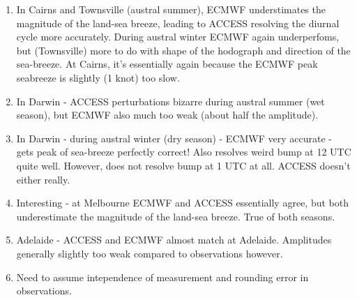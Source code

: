 \documentclass{article}
\begin{document}
\begin{enumerate}
\item
In Cairns and Townsville (austral summer), ECMWF understimates the magnitude of the land-sea breeze, leading to ACCESS resolving the diurnal cycle more accurately. During austral winter ECMWF again underperfoms, but (Townsville) more to do with shape of the hodograph and direction of the sea-breeze. At Cairns, it's essentially again because the ECMWF peak seabreeze is slightly (1 knot) too slow.   
\item
In Darwin - ACCESS perturbations bizarre during austral summer (wet season), but ECMWF also much too weak (about half the amplitude). 
\item
In Darwin - during austral winter (dry season) - ECMWF very accurate - gets peak of sea-breeze perfectly correct! Also resolves weird bump at 12 UTC quite well. However, does not resolve bump at 1 UTC at all. ACCESS doesn't either really. 
\item
Interesting - at Melbourne ECMWF and ACCESS essentially agree, but both underestimate the magnitude of the land-sea breeze. True of both seasons. 
\item
Adelaide - ACCESS and ECMWF almost match at Adelaide. Amplitudes generally slightly too weak compared to observations however. 
\item
Need to assume intependence of measurement and rounding error in observations. 
\end{enumerate}
\end{document}
